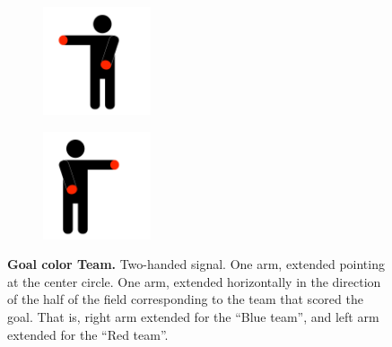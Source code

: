         \begin{figure}[ht!]
            \centering
            \begin{subfigure}{.33\textwidth}
                \includegraphics[height=120px]{figs/referee-signals/goal.png}
            \end{subfigure}
            \begin{subfigure}{.33\textwidth}
                \includegraphics[height=120px]{figs/referee-signals/goal-flipped.png}
            \end{subfigure}
            \caption{\textbf{Goal \textlangle{}color\textrangle{}  Team.}
            Two-handed signal. One arm, extended pointing at the center circle. One arm, extended horizontally in the direction of the half of the field corresponding to the team that scored the goal. That is, right arm extended for the ``Blue team'', and left arm extended for the ``Red team''.}
        \end{figure}

